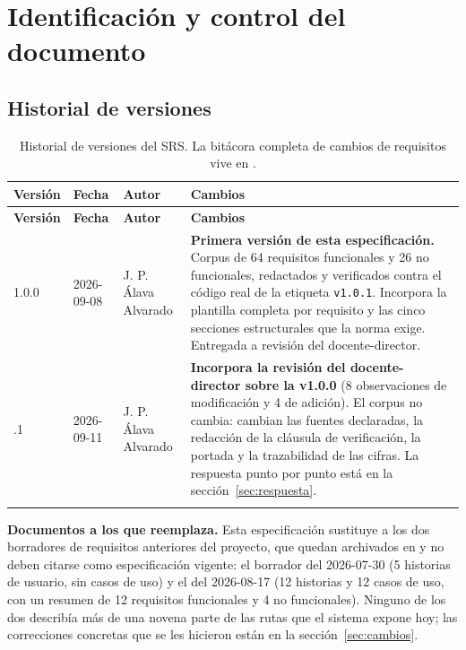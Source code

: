 \documentclass[11pt,a4paper]{article}
\DeclareRobustCommand{\cd}[1]{\texttt{\protect\seqsplit{#1}}}
\begin{document}
\tableofcontents
\newpage

\section{Identificación y control del documento}

\subsection{Historial de versiones}

\begin{longtable}{p{1.6cm} p{1.8cm} p{2.6cm} p{8.2cm}}
\toprule
\textbf{Versión} & \textbf{Fecha} & \textbf{Autor} & \textbf{Cambios} \\
\midrule
\endfirsthead
\toprule
\textbf{Versión} & \textbf{Fecha} & \textbf{Autor} & \textbf{Cambios} \\
\midrule
\endhead
1.0.0 & 2026-09-08 & J. P. Álava Alvarado &
\textbf{Primera versión de esta especificación.} Corpus de 64 requisitos funcionales y 26 no
funcionales, redactados y verificados contra el código real de la etiqueta \texttt{v1.0.1}.
Incorpora la plantilla completa por requisito y las cinco secciones estructurales que la norma
exige. Entregada a revisión del docente-director. \\
\addlinespace
1.0.1 & 2026-09-11 & J. P. Álava Alvarado &
\textbf{Incorpora la revisión del docente-director sobre la v1.0.0} (8 observaciones de
modificación y 4 de adición). El corpus no cambia: cambian las fuentes declaradas, la redacción
de la cláusula de verificación, la portada y la trazabilidad de las cifras. La respuesta punto por
punto está en la sección~\ref{sec:respuesta}. \\
\bottomrule
\caption{Historial de versiones del SRS. La bitácora completa de cambios de requisitos
vive en \cd{docs/requisitos/CHANGELOG-REQ.md}.}
\end{longtable}

\noindent\textbf{Documentos a los que reemplaza.} Esta especificación sustituye a los dos
borradores de requisitos anteriores del proyecto, que quedan archivados en
\cd{docs/requisitos/historico/} y no deben citarse como especificación vigente: el borrador del
2026-07-30 (5 historias de usuario, sin casos de uso) y el del 2026-08-17 (12 historias y 12 casos
de uso, con un resumen de 12 requisitos funcionales y 4 no funcionales). Ninguno de los dos
describía más de una novena parte de las rutas que el sistema expone hoy; las correcciones
concretas que se les hicieron están en la sección~\ref{sec:cambios}.
\end{document}
